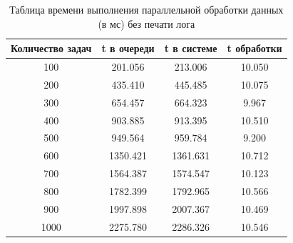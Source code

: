 \documentclass[12pt]{report}
\begin{document}
\begin{table} [h!]
	\caption{Таблица времени выполнения параллельной обработки данных (в мс) без печати лога}
	\label{tableComp}
	\begin{center}
		\begin{tabular}{|c c c c|} 
			\hline
			Количество задач & t в очереди & t в системе & t обработки \\  
			\hline
			100 & 201.056 & 213.006 & 10.050 \\
			\hline
			200 & 435.410 & 445.485 & 10.075 \\
			\hline
			300 & 654.457 & 664.323 & 9.967 \\
			\hline
			400 & 903.885 & 913.395 & 10.510 \\
			\hline
			500 & 949.564 & 959.784 & 9.200 \\
			\hline
			600 & 1350.421 & 1361.631 & 10.712 \\
			\hline
			700 & 1564.387 & 1574.547 & 10.123 \\
			\hline
			800 & 1782.399 & 1792.965 & 10.566 \\
			\hline
			900 & 1997.898 & 2007.367 & 10.469 \\
			\hline
			1000 & 2275.780 & 2286.326 & 10.546 \\
			\hline
		\end{tabular}
	\end{center}
\end{table}
\newpage
\end{document}

